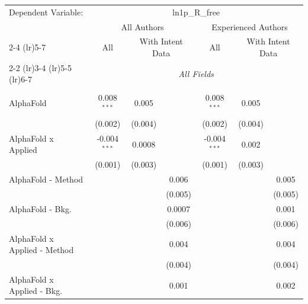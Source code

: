 \begingroup
\centering
\begin{tabular}{lcccccc}
   \tabularnewline \midrule \midrule
   Dependent Variable: & \multicolumn{6}{c}{ln1p\_R\_free}\\
 & \multicolumn{3}{c}{All Authors} & \multicolumn{3}{c}{Experienced Authors} \\
\cmidrule(lr){2-4} \cmidrule(lr){5-7}
 & \multicolumn{1}{c}{All} & \multicolumn{2}{c}{With Intent Data} & \multicolumn{1}{c}{All} & \multicolumn{2}{c}{With Intent Data} \\
\cmidrule(lr){2-2} \cmidrule(lr){3-4} \cmidrule(lr){5-5} \cmidrule(lr){6-7}
 & \multicolumn{6}{c}{\textit{All Fields}} \\ \\
   AlphaFold                      & 0.008$^{***}$  & 0.005          &                & 0.008$^{***}$  & 0.005          &   \\   
                                  & (0.002)        & (0.004)        &                & (0.002)        & (0.004)        &   \\   
   AlphaFold x Applied            & -0.004$^{***}$ & 0.0008         &                & -0.004$^{***}$ & 0.002          &   \\   
                                  & (0.001)        & (0.003)        &                & (0.001)        & (0.003)        &   \\   
   AlphaFold - Method             &                &                & 0.006          &                &                & 0.005\\   
                                  &                &                & (0.005)        &                &                & (0.005)\\   
   AlphaFold - Bkg.               &                &                & 0.0007         &                &                & 0.001\\   
                                  &                &                & (0.006)        &                &                & (0.006)\\   
   AlphaFold x Applied - Method   &                &                & 0.004          &                &                & 0.004\\   
                                  &                &                & (0.004)        &                &                & (0.004)\\   
   AlphaFold x Applied - Bkg.     &                &                & 0.001          &                &                & 0.002\\   

\end{tabular}
